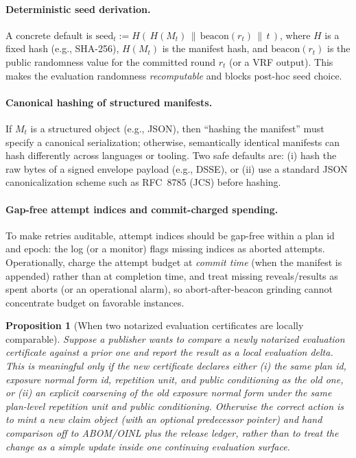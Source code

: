 \documentclass[11pt]{article}
\newtheorem{proposition}{Proposition}
\begin{document}
\paragraph{Deterministic seed derivation.}
A concrete default is
$\mathrm{seed}_t := H(\,H(M_t)\,\|\,\mathrm{beacon}(r_t)\,\|\,t\,)$,
where $H$ is a fixed hash (e.g., SHA-256), $H(M_t)$ is the manifest hash, and $\mathrm{beacon}(r_t)$ is the public randomness value for the committed round $r_t$ (or a VRF output).
This makes the evaluation randomness \emph{recomputable} and blocks post-hoc seed choice.

\paragraph{Canonical hashing of structured manifests.}
If $M_t$ is a structured object (e.g., JSON), then ``hashing the manifest'' must specify a canonical serialization;
otherwise, semantically identical manifests can hash differently across languages or tooling.
Two safe defaults are: (i) hash the raw bytes of a signed envelope payload (e.g., DSSE), or (ii) use a standard JSON canonicalization scheme such as RFC~8785 (JCS) before hashing.\cite{rfc8785}



\paragraph{Gap-free attempt indices and commit-charged spending.}
To make retries auditable, attempt indices should be gap-free within a plan id and epoch: the log (or a monitor) flags missing indices as aborted attempts.
Operationally, charge the attempt budget at \emph{commit time} (when the manifest is appended) rather than at completion time, and treat missing reveals/results as spent aborts (or an operational alarm), so abort-after-beacon grinding cannot concentrate budget on favorable instances.

\begin{proposition}[When two notarized evaluation certificates are locally comparable]
\label{prop:notary-lineage}
Suppose a publisher wants to compare a newly notarized evaluation certificate against a prior one and report the result as a local evaluation delta.
This is meaningful only if the new certificate declares either
(i) the same plan id, exposure normal form id, repetition unit, and public conditioning as the old one, or
(ii) an explicit coarsening of the old exposure normal form under the same plan-level repetition unit and public conditioning.
Otherwise the correct action is to mint a new claim object (with an optional predecessor pointer) and hand comparison off to ABOM/OINL plus the release ledger, rather than to treat the change as a simple update inside one continuing evaluation surface.
\end{proposition}
\end{document}
